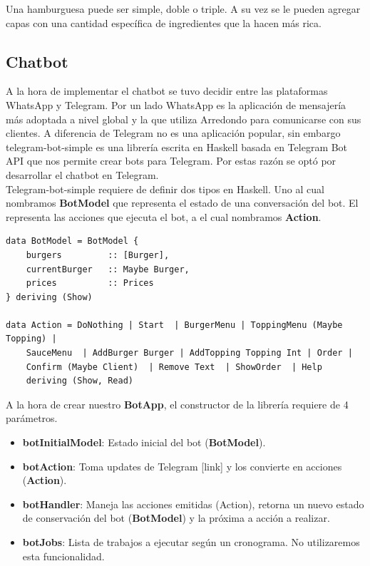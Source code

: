 \documentclass[a4paper,12pt]{article}
\begin{document}
Una hamburguesa puede ser simple, doble o triple. A su vez se le pueden agregar capas con una cantidad específica de ingredientes que la hacen más rica.

\subsection{Chatbot	}

A la hora de implementar el chatbot se tuvo decidir entre las plataformas WhatsApp y Telegram. Por un lado WhatsApp es la aplicación de mensajería más adoptada a nivel global y la que utiliza Arredondo para comunicarse con sus clientes. A diferencia de Telegram no es una aplicación popular, sin embargo telegram-bot-simple \cite{telegram-bot-simple} es una librería escrita en Haskell basada en Telegram Bot API \cite{telegram-bot-api} que nos permite crear bots para Telegram. Por estas razón se optó por desarrollar el chatbot en Telegram.
\\
Telegram-bot-simple requiere de definir dos tipos en Haskell. Uno al cual nombramos \textbf{BotModel} que representa el estado de una conversación del bot. El representa las acciones que ejecuta el bot, a el cual nombramos \textbf{Action}.

\begin{verbatim}
data BotModel = BotModel {
	burgers         :: [Burger],
	currentBurger   :: Maybe Burger,
	prices          :: Prices
} deriving (Show)

data Action = DoNothing | Start  | BurgerMenu | ToppingMenu (Maybe Topping) |
	SauceMenu  | AddBurger Burger | AddTopping Topping Int | Order |
	Confirm (Maybe Client)  | Remove Text  | ShowOrder  | Help  
	deriving (Show, Read)
\end{verbatim}

A la hora de crear nuestro \textbf{BotApp}, el constructor de la librería requiere de 4 parámetros.

\begin{itemize}
	\item \textbf{botInitialModel}: Estado inicial del bot (\textbf{BotModel}).
	\item \textbf{botAction}: Toma updates de Telegram [link] y los convierte en acciones (\textbf{Action}).
	\item \textbf{botHandler}: Maneja las acciones emitidas (Action), retorna un nuevo estado de conservación del bot (\textbf{BotModel}) y la próxima a acción a realizar.
	\item \textbf{botJobs}: Lista de trabajos a ejecutar según un cronograma. No utilizaremos esta funcionalidad.
\end{itemize}
\end{document}

